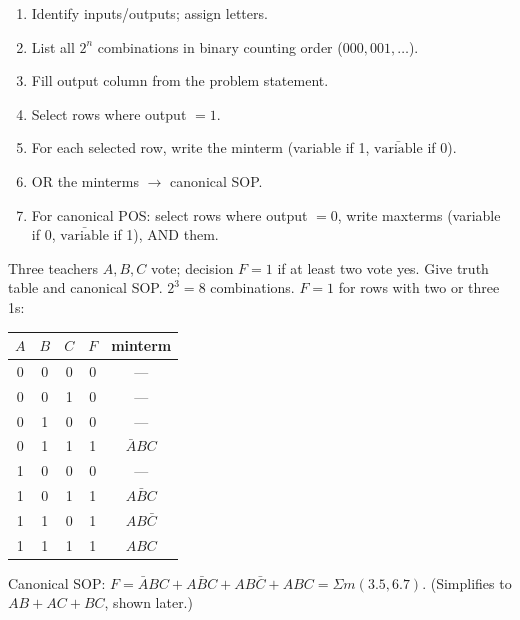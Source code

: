 \documentclass[11pt]{article}
\begin{document}
\begin{methode}
\begin{enumerate}
\item Identify inputs/outputs; assign letters.
\item List all $2^n$ combinations in binary counting order ($000, 001, \dots$).
\item Fill output column from the problem statement.
\item Select rows where output $=1$.
\item For each selected row, write the minterm (variable if 1, $\bar{\text{variable}}$ if 0).
\item OR the minterms $\to$ canonical SOP.
\item For canonical POS: select rows where output $=0$, write maxterms (variable if 0, $\bar{\text{variable}}$ if 1), AND them.
\end{enumerate}
\end{methode}

\begin{exoresolu}
Three teachers $A,B,C$ vote; decision $F=1$ if at least two vote yes. Give truth table and canonical SOP.
\tcblower
$2^3=8$ combinations. $F=1$ for rows with two or three 1s:
\begin{center}
\begin{tabular}{|ccc|c|c|}
\hline
\rowcolor{popblueL} $A$ & $B$ & $C$ & $F$ & minterm \\
\hline
0 & 0 & 0 & 0 & --- \\
0 & 0 & 1 & 0 & --- \\
0 & 1 & 0 & 0 & --- \\
0 & 1 & 1 & 1 & $\bar{A}BC$ \\
1 & 0 & 0 & 0 & --- \\
1 & 0 & 1 & 1 & $A\bar{B}C$ \\
1 & 1 & 0 & 1 & $AB\bar{C}$ \\
1 & 1 & 1 & 1 & $ABC$ \\
\hline
\end{tabular}
\end{center}
Canonical SOP: $F=\bar{A}BC+A\bar{B}C+AB\bar{C}+ABC = \Sigma m(3.5,6.7)$.
(Simplifies to $AB+AC+BC$, shown later.)
\end{exoresolu}
\end{document}
